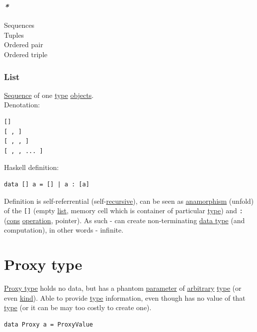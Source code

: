 \documentclass[a4paper,14pt,oneside]{book}
\begin{document}
{\subsubsection{\emph{*}}
\label{sec:org81cd314}

\label{orga60d291}Sequences\\
\label{orgabace30}Tuples\\
\label{org0879cb4}Ordered pair\\
\label{orgf3d390b}Ordered triple\\

\subsubsection{\label{org47d56c8}List}
\label{sec:org5349a53}
\hyperref[org3e94228]{Sequence} of one \hyperref[orga9ca243]{type} \hyperref[org7c09bf4]{objects}.\\

Denotation:\\
\begin{verbatim}
[]
[ , ]
[ , , ]
[ , , ... ]
\end{verbatim}

Haskell definition:\\
\begin{verbatim}
data [] a = [] | a : [a]
\end{verbatim}

Definition is self-referrential (self-\hyperref[org692ee3f]{recursive}), can be seen as \hyperref[org13c3c8d]{anamorphism} (unfold) of the \texttt{[]} (empty \hyperref[org47d56c8]{list}, memory cell which is container of particular \hyperref[orga9ca243]{type}) and \texttt{:} (\hyperref[orgc796c88]{cons} \hyperref[org4cee8d5]{operation}, pointer). As such - can create non-terminating \hyperref[org3de168a]{data type} (and computation), in other words - infinite.\\

\section{\label{org4ff8e74}Proxy type}
\label{sec:orgf7926b5}
\hyperref[org4ff8e74]{Proxy type} holds no data, but has a phantom \hyperref[org0db8baa]{parameter} of \hyperref[org4a2927f]{arbitrary} \hyperref[orga9ca243]{type} (or even \hyperref[org3e1a79e]{kind}). Able to provide \hyperref[orga9ca243]{type} information, even though has no value of that \hyperref[orga9ca243]{type} (or it can be may too costly to create one).\\
\begin{verbatim}
data Proxy a = ProxyValue


\end{verbatim}}
\end{document}
